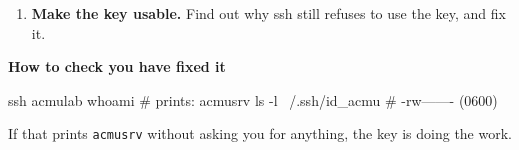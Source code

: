 \documentclass[11pt,a4paper]{article}
\newcommand{\hd}[1]{\medskip\textbf{#1}\par\nopagebreak}
\begin{document}
\begin{enumerate}[label=\textbf{Q\arabic*.},leftmargin=2.6em,labelsep=0.6em,itemsep=1.6em,topsep=1.2em]
\begin{enumerate}[label=\textbf{\arabic{enumi}.\arabic*},leftmargin=2.8em,itemsep=0.3em]
  \item \textbf{Make the key usable.} 
  Find out why ssh still refuses to use the key, and fix it.
\end{enumerate}

\hd{How to check you have fixed it}
\begin{shell}
ssh acmulab whoami                      # prints: acmusrv
ls -l ~/.ssh/id_acmu                    # -rw------- (0600)
\end{shell}
If that prints \texttt{acmusrv} without asking you for anything, the key is
doing the work.


\end{enumerate}
\end{document}
